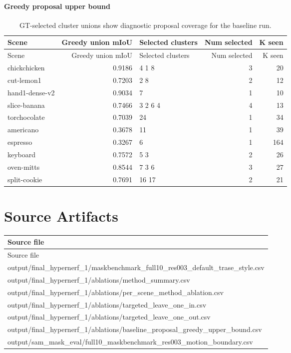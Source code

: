 \documentclass[10pt]{article}
\begin{document}
\paragraph{Greedy proposal upper bound}
\small
\begin{longtable}{lrlrr}
\caption{GT-selected cluster unions show diagnostic proposal coverage for the baseline run.}\\
\toprule
Scene & Greedy union mIoU & Selected clusters & Num selected & K seen \\
\midrule
\endfirsthead
\toprule
Scene & Greedy union mIoU & Selected clusters & Num selected & K seen \\
\midrule
\endhead
chickchicken & 0.9186 & 4 1 8 & 3 & 20 \\
cut-lemon1 & 0.7203 & 2 8 & 2 & 12 \\
hand1-dense-v2 & 0.9034 & 7 & 1 & 10 \\
slice-banana & 0.7466 & 3 2 6 4 & 4 & 13 \\
torchocolate & 0.7039 & 24 & 1 & 34 \\
americano & 0.3678 & 11 & 1 & 39 \\
espresso & 0.3267 & 6 & 1 & 164 \\
keyboard & 0.7572 & 5 3 & 2 & 26 \\
oven-mitts & 0.8544 & 7 3 6 & 3 & 27 \\
split-cookie & 0.7691 & 16 17 & 2 & 21 \\
\bottomrule
\end{longtable}
\normalsize

\section{Source Artifacts}
\small
\begin{longtable}{p{15cm}}
\toprule
Source file \\
\midrule
\endfirsthead
\toprule
Source file \\
\midrule
\endhead
output/final\_hypernerf\_1/maskbenchmark\_full10\_res003\_default\_trase\_style.csv \\
output/final\_hypernerf\_1/ablations/method\_summary.csv \\
output/final\_hypernerf\_1/ablations/per\_scene\_method\_ablation.csv \\
output/final\_hypernerf\_1/ablations/targeted\_leave\_one\_in.csv \\
output/final\_hypernerf\_1/ablations/targeted\_leave\_one\_out.csv \\
output/final\_hypernerf\_1/ablations/baseline\_proposal\_greedy\_upper\_bound.csv \\
output/sam\_mask\_eval/full10\_maskbenchmark\_res003\_motion\_boundary.csv \\
\bottomrule
\end{longtable}
\normalsize
\end{document}
